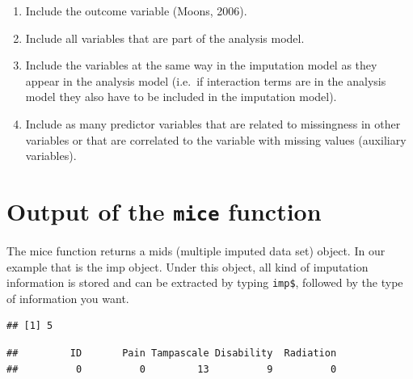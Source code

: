 \documentclass[]{book}
\newenvironment{Shaded}{\begin{snugshade}}{\end{snugshade}}
\newcommand{\OperatorTok}[1]{\textcolor[rgb]{0.81,0.36,0.00}{\textbf{#1}}}
\newcommand{\NormalTok}[1]{#1}
\begin{document}
\begin{enumerate}
\def\labelenumi{\arabic{enumi}.}
\item
  Include the outcome variable (Moons, 2006).
\item
  Include all variables that are part of the analysis model.
\item
  Include the variables at the same way in the imputation model as they
  appear in the analysis model (i.e.~if interaction terms are in the
  analysis model they also have to be included in the imputation model).
\item
  Include as many predictor variables that are related to missingness in
  other variables or that are correlated to the variable with missing
  values (auxiliary variables).
\end{enumerate}

\section{\texorpdfstring{Output of the \texttt{mice}
function}{Output of the mice function}}\label{output-of-the-mice-function}

The mice function returns a mids (multiple imputed data set) object. In
our example that is the imp object. Under this object, all kind of
imputation information is stored and can be extracted by typing
\texttt{imp\$}, followed by the type of information you want.

\begin{Shaded}
\end{Shaded}

\begin{verbatim}
## [1] 5
\end{verbatim}

\begin{Shaded}
\end{Shaded}

\begin{verbatim}
##         ID       Pain Tampascale Disability  Radiation 
##          0          0         13          9          0
\end{verbatim}

\begin{Shaded}
\end{Shaded}
\end{document}
